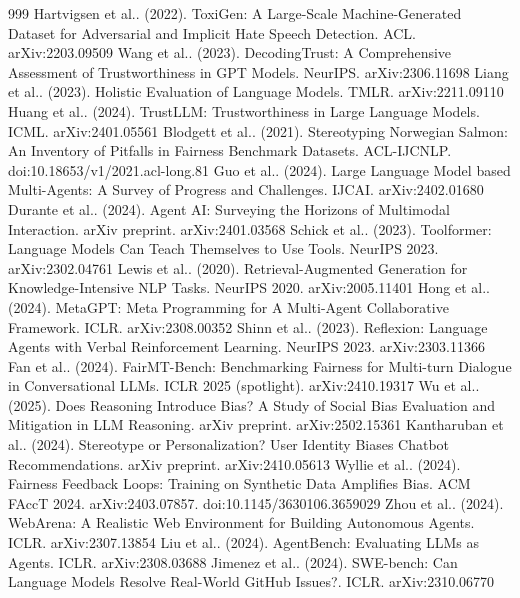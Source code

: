 \documentclass[10pt]{article}
\begin{document}
\begin{thebibliography}{999}
 Hartvigsen et al.. (2022). ToxiGen: A Large-Scale Machine-Generated Dataset for Adversarial and Implicit Hate Speech Detection. ACL. arXiv:2203.09509
 Wang et al.. (2023). DecodingTrust: A Comprehensive Assessment of Trustworthiness in GPT Models. NeurIPS. arXiv:2306.11698
 Liang et al.. (2023). Holistic Evaluation of Language Models. TMLR. arXiv:2211.09110
 Huang et al.. (2024). TrustLLM: Trustworthiness in Large Language Models. ICML. arXiv:2401.05561
 Blodgett et al.. (2021). Stereotyping Norwegian Salmon: An Inventory of Pitfalls in Fairness Benchmark Datasets. ACL-IJCNLP. doi:10.18653/v1/2021.acl-long.81
 Guo et al.. (2024). Large Language Model based Multi-Agents: A Survey of Progress and Challenges. IJCAI. arXiv:2402.01680
 Durante et al.. (2024). Agent AI: Surveying the Horizons of Multimodal Interaction. arXiv preprint. arXiv:2401.03568
 Schick et al.. (2023). Toolformer: Language Models Can Teach Themselves to Use Tools. NeurIPS 2023. arXiv:2302.04761
 Lewis et al.. (2020). Retrieval-Augmented Generation for Knowledge-Intensive NLP Tasks. NeurIPS 2020. arXiv:2005.11401
 Hong et al.. (2024). MetaGPT: Meta Programming for A Multi-Agent Collaborative Framework. ICLR. arXiv:2308.00352
 Shinn et al.. (2023). Reflexion: Language Agents with Verbal Reinforcement Learning. NeurIPS 2023. arXiv:2303.11366
 Fan et al.. (2024). FairMT-Bench: Benchmarking Fairness for Multi-turn Dialogue in Conversational LLMs. ICLR 2025 (spotlight). arXiv:2410.19317
 Wu et al.. (2025). Does Reasoning Introduce Bias? A Study of Social Bias Evaluation and Mitigation in LLM Reasoning. arXiv preprint. arXiv:2502.15361
 Kantharuban et al.. (2024). Stereotype or Personalization? User Identity Biases Chatbot Recommendations. arXiv preprint. arXiv:2410.05613
 Wyllie et al.. (2024). Fairness Feedback Loops: Training on Synthetic Data Amplifies Bias. ACM FAccT 2024. arXiv:2403.07857. doi:10.1145/3630106.3659029
 Zhou et al.. (2024). WebArena: A Realistic Web Environment for Building Autonomous Agents. ICLR. arXiv:2307.13854
 Liu et al.. (2024). AgentBench: Evaluating LLMs as Agents. ICLR. arXiv:2308.03688
 Jimenez et al.. (2024). SWE-bench: Can Language Models Resolve Real-World GitHub Issues?. ICLR. arXiv:2310.06770

\end{thebibliography}
\end{document}
